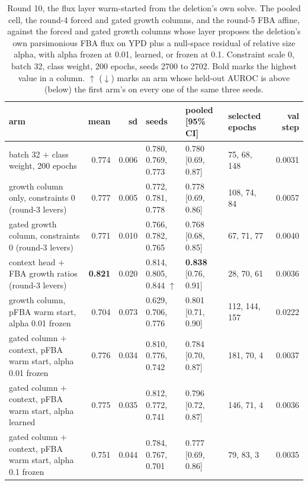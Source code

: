 \begin{table}[H]
  \centering
  \scriptsize
  \setlength{\tabcolsep}{3pt}
  \caption[Round 10, the flux layer warm-started from the deletion's own solve]{Round 10, the flux layer warm-started from the deletion's own solve. The pooled cell, the round-4 forced and gated growth columns, and the round-5 FBA affine, against the forced and gated growth columns whose layer proposes the deletion's own parsimonious FBA flux on YPD plus a null-space residual of relative size alpha, with alpha frozen at 0.01, learned, or frozen at 0.1. Constraint scale 0, batch 32, class weight, 200 epochs, seeds 2700 to 2702. Bold marks the highest value in a column. $\uparrow$ ($\downarrow$) marks an arm whose held-out AUROC is above (below) the first arm's on every one of the same three seeds.}
  \label{tab:w21}
  \begin{tabular}{@{}lrrlllr@{}}
    \hline
    arm & mean & sd & seeds & pooled [95\% CI] & selected epochs & val step \\
    \hline
    batch 32 $+$ class weight, 200 epochs & 0.774 & 0.006 & 0.780, 0.769, 0.773 & 0.780 [0.69, 0.87] & 75, 68, 148 & 0.0031 \\
    growth column only, constraints 0 (round-3 levers) & 0.777 & 0.005 & 0.772, 0.781, 0.778 & 0.778 [0.69, 0.86] & 108, 74, 84 & 0.0057 \\
    gated growth column, constraints 0 (round-3 levers) & 0.771 & 0.010 & 0.766, 0.782, 0.765 & 0.768 [0.68, 0.85] & 67, 71, 77 & 0.0040 \\
    context head $+$ FBA growth ratios (round-3 levers) & \textbf{0.821} & 0.020 & 0.814, 0.805, 0.844 $\uparrow$ & \textbf{0.838} [0.76, 0.91] & 28, 70, 61 & 0.0036 \\
    growth column, pFBA warm start, alpha 0.01 frozen & 0.704 & 0.073 & 0.629, 0.706, 0.776 & 0.801 [0.71, 0.90] & 112, 144, 157 & 0.0222 \\
    gated column $+$ context, pFBA warm start, alpha 0.01 frozen & 0.776 & 0.034 & 0.810, 0.776, 0.742 & 0.784 [0.70, 0.87] & 181, 70, 4 & 0.0037 \\
    gated column $+$ context, pFBA warm start, alpha learned & 0.775 & 0.035 & 0.812, 0.772, 0.741 & 0.796 [0.72, 0.87] & 146, 71, 4 & 0.0036 \\
    gated column $+$ context, pFBA warm start, alpha 0.1 frozen & 0.751 & 0.044 & 0.784, 0.767, 0.701 & 0.777 [0.69, 0.86] & 79, 83, 3 & 0.0035 \\
    \hline
  \end{tabular}
\end{table}
